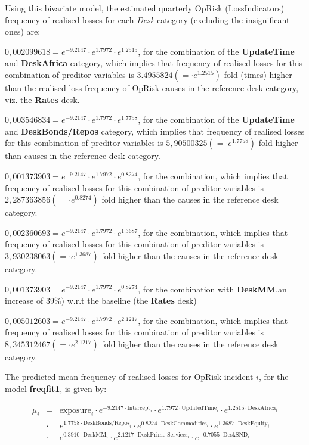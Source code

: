 \documentclass[]{DissertateUSU}
\begin{document}
\doublespacing
Using this bivariate model, the estimated quarterly OpRisk
(LossIndicators) frequency of realised losses for each \emph{Desk}
category (excluding the insignificant ones) are:

\begin{list}{*}{}
\item $0,002099618  = e^{-9.2147}\cdot e^{1.7972}\cdot e^{1.2515}$, for the combination of the \textbf{UpdateTime} and \textbf{DeskAfrica} category, which implies that frequency of realised losses for this combination of preditor variables is $3.4955824(=\cdot e^{1.2515})$ fold (times) higher than the realised loss frequency of OpRisk causes in the reference desk category, viz. the \textbf{Rates} desk. 
\item $0,003546834 = e^{-9.2147}\cdot e^{1.7972}\cdot e^{1.7758}$, for the combination of the \textbf{UpdateTime} and \textbf{DeskBonds/Repos} category, which implies that frequency of realised losses for this combination of preditor variables is $5,90500325(=\cdot e^{1.7758})$ fold higher than causes in the reference desk category.
\item $0,001373903 = e^{-9.2147}\cdot e^{1.7972}\cdot e^{0.8274}$, for the combination, which implies that frequency of realised losses for this combination of preditor variables is $2,287363856(=\cdot e^{0.8274})$ fold higher than the causes in the reference desk category.
\item $0,002360693= e^{-9.2147}\cdot e^{1.7972}\cdot e^{1.3687}$, for the combination, which implies that frequency of realised losses for this combination of preditor variables is $3,930238063(=\cdot e^{1.3687})$ fold higher than the causes in the reference desk category.
\item $0,001373903 = e^{-9.2147}\cdot e^{1.7972}\cdot e^{0.8274}$, for the combination with \textbf{DeskMM},an increase of $39\%)$ w.r.t the baseline (the \textbf{Rates} desk)
\item $0,005012603= e^{-9.2147}\cdot e^{1.7972}\cdot e^{2.1217}$, for the combination, which implies that frequency of realised losses for this combination of preditor variables is $8,345312467(=\cdot e^{2.1217})$ fold higher than the causes in the reference desk category.
\end{list}

The predicted mean frequency of realised losses for OpRisk incident
\(i\), for the model \textbf{freqfit1}, is given by:

\singlespacing

\begin{eqnarray}
\mu_{i}& = &\mbox{exposure}_i\cdot e^{-9.2147\cdot \mbox{Intercept}_i}\cdot e^{1.7972\cdot \mbox{UpdatedTime}_i}\cdot e^{1.2515\cdot \mbox{DeskAfrica}_i}\nonumber\\
&\cdot&e^{1.7758\cdot \mbox{DeskBonds/Repos}_i}\cdot e^{0.8274\cdot \mbox{DeskCommodities}_i}\cdot e^{1.3687\cdot \mbox{DeskEquity}_i}\nonumber\\
&\cdot& e^{0.3910\cdot \mbox{DeskMM}_i}\cdot e^{2.1217\cdot \mbox{DeskPrime Services}_i}\cdot e^{-0.7055\cdot \mbox{DeskSND}_i}
\end{eqnarray}
\end{document}
